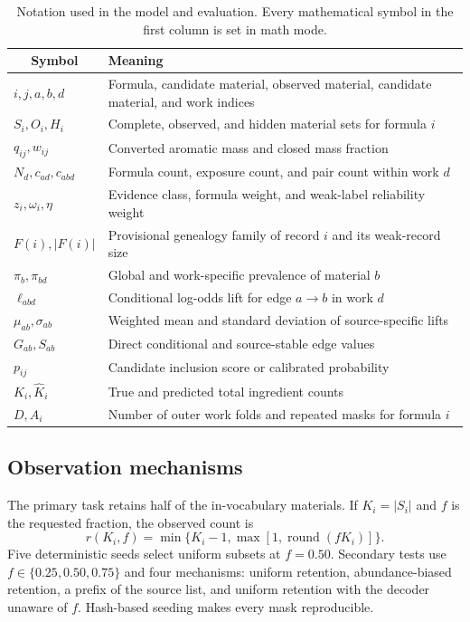 \documentclass[11pt,a4paper]{article}
\begin{document}
\begin{table}[t]
\centering
\caption{Notation used in the model and evaluation. Every mathematical symbol in the first column is set in math mode.}
\label{tab:notation}
\small
\begin{tabularx}{\linewidth}{@{}lX@{}}
\toprule
\multicolumn{1}{c}{Symbol} & Meaning \\
\midrule
$i,j,a,b,d$ & Formula, candidate material, observed material, candidate material, and work indices \\
$S_i,O_i,H_i$ & Complete, observed, and hidden material sets for formula $i$ \\
$q_{ij},w_{ij}$ & Converted aromatic mass and closed mass fraction \\
$N_d,c_{ad},c_{abd}$ & Formula count, exposure count, and pair count within work $d$ \\
$z_i,\omega_i,\eta$ & Evidence class, formula weight, and weak-label reliability weight \\
$F(i),|F(i)|$ & Provisional genealogy family of record $i$ and its weak-record size \\
$\pi_b,\pi_{bd}$ & Global and work-specific prevalence of material $b$ \\
$\ell_{abd}$ & Conditional log-odds lift for edge $a\rightarrow b$ in work $d$ \\
$\mu_{ab},\sigma_{ab}$ & Weighted mean and standard deviation of source-specific lifts \\
$G_{ab},S_{ab}$ & Direct conditional and source-stable edge values \\
$p_{ij}$ & Candidate inclusion score or calibrated probability \\
$K_i,\widehat K_i$ & True and predicted total ingredient counts \\
$D,A_i$ & Number of outer work folds and repeated masks for formula $i$ \\
\bottomrule
\end{tabularx}
\end{table}

\subsection{Observation mechanisms}

The primary task retains half of the in-vocabulary materials. If $K_i=|S_i|$ and $f$ is the requested fraction, the observed count is
\begin{equation}
r(K_i,f)=\min\{K_i-1,\max[1,\operatorname{round}(fK_i)]\}.
\label{eq:maskcount}
\end{equation}
Five deterministic seeds select uniform subsets at $f=0.50$. Secondary tests use $f\in\{0.25,0.50,0.75\}$ and four mechanisms: uniform retention, abundance-biased retention, a prefix of the source list, and uniform retention with the decoder unaware of $f$. Hash-based seeding makes every mask reproducible.
\end{document}
